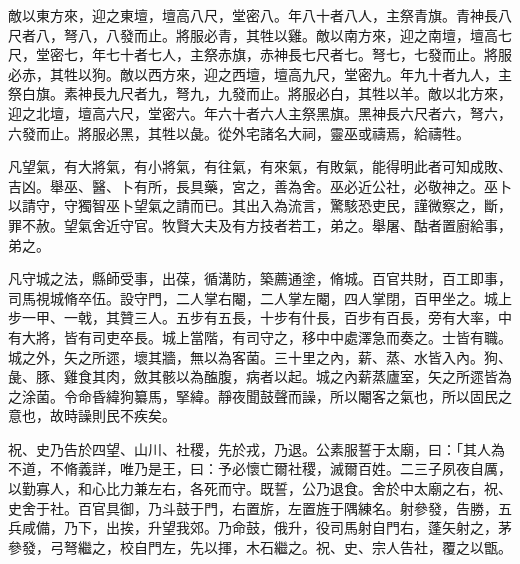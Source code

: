 
\begin{pinyinscope}
敵以東方來，迎之東壇，壇高八尺，堂密八。年八十者八人，主祭青旗。青神長八尺者八，弩八，八發而止。將服必青，其牲以雞。敵以南方來，迎之南壇，壇高七尺，堂密七，年七十者七人，主祭赤旗，赤神長七尺者七。弩七，七發而止。將服必赤，其牲以狗。敵以西方來，迎之西壇，壇高九尺，堂密九。年九十者九人，主祭白旗。素神長九尺者九，弩九，九發而止。將服必白，其牲以羊。敵以北方來，迎之北壇，壇高六尺，堂密六。年六十者六人主祭黑旗。黑神長六尺者六，弩六，六發而止。將服必黑，其牲以彘。從外宅諸名大祠，靈巫或禱焉，給禱牲。

凡望氣，有大將氣，有小將氣，有往氣，有來氣，有敗氣，能得明此者可知成敗、吉凶。舉巫、醫、卜有所，長具藥，宮之，善為舍。巫必近公社，必敬神之。巫卜以請守，守獨智巫卜望氣之請而已。其出入為流言，驚駭恐吏民，謹微察之，斷，罪不赦。望氣舍近守官。牧賢大夫及有方技者若工，弟之。舉屠、酤者置廚給事，弟之。

凡守城之法，縣師受事，出葆，循溝防，築薦通塗，脩城。百官共財，百工即事，司馬視城脩卒伍。設守門，二人掌右閹，二人掌左閹，四人掌閉，百甲坐之。城上步一甲、一戟，其贊三人。五步有五長，十步有什長，百步有百長，旁有大率，中有大將，皆有司吏卒長。城上當階，有司守之，移中中處澤急而奏之。士皆有職。城之外，矢之所遝，壞其牆，無以為客菌。三十里之內，薪、蒸、水皆入內。狗、彘、豚、雞食其肉，斂其骸以為醢腹，病者以起。城之內薪蒸廬室，矢之所遝皆為之涂菌。令命昏緯狗纂馬，掔緯。靜夜聞鼓聲而譟，所以閹客之氣也，所以固民之意也，故時譟則民不疾矣。

祝、史乃告於四望、山川、社稷，先於戎，乃退。公素服誓于太廟，曰：「其人為不道，不脩義詳，唯乃是王，曰：予必懷亡爾社稷，滅爾百姓。二三子夙夜自厲，以勤寡人，和心比力兼左右，各死而守。既誓，公乃退食。舍於中太廟之右，祝、史舍于社。百官具御，乃斗鼓于門，右置旂，左置旌于隅練名。射參發，告勝，五兵咸備，乃下，出挨，升望我郊。乃命鼓，俄升，役司馬射自門右，蓬矢射之，茅參發，弓弩繼之，校自門左，先以揮，木石繼之。祝、史、宗人告社，覆之以甑。


\end{pinyinscope}